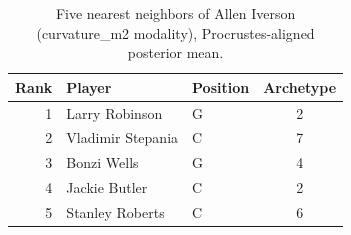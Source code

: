 \begin{table}[htbp]
  \centering\small
  \begin{tabular}{rllc}
    \toprule
    Rank & Player & Position & Archetype \\
    \midrule
    1 & Larry Robinson & G & 2 \\
    2 & Vladimir Stepania & C & 7 \\
    3 & Bonzi Wells & G & 4 \\
    4 & Jackie Butler & C & 2 \\
    5 & Stanley Roberts & C & 6 \\
    \bottomrule
  \end{tabular}
  \caption{Five nearest neighbors of Allen Iverson (curvature_m2 modality), Procrustes-aligned posterior mean.}
  \label{tab:Allen_Iverson_neighbors_curvature_m2}
\end{table}

